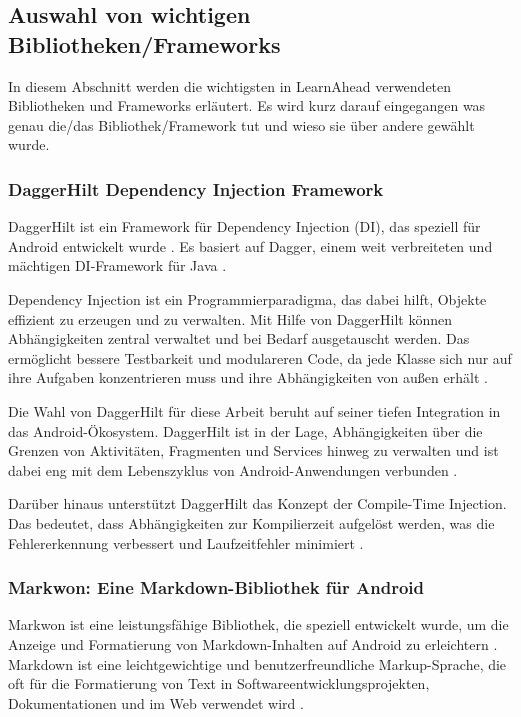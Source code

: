 \subsection{Auswahl von wichtigen Bibliotheken/Frameworks} \label{Auswahl BibliothekenFrameworks}
In diesem Abschnitt werden die wichtigsten in LearnAhead verwendeten Bibliotheken und Frameworks erläutert. Es wird kurz darauf eingegangen was genau die/das Bibliothek/Framework tut und wieso sie über andere gewählt wurde.

\subsubsection{DaggerHilt Dependency Injection Framework}
DaggerHilt ist ein Framework für Dependency Injection (DI), das speziell für Android entwickelt wurde \cite{Dagger2021}. Es basiert auf Dagger, einem weit verbreiteten und mächtigen DI-Framework für Java \cite{AndroidDevelopers2021}. \newline

\noindent
Dependency Injection ist ein Programmierparadigma, das dabei hilft, Objekte effizient zu erzeugen und zu verwalten. Mit Hilfe von DaggerHilt können Abhängigkeiten zentral verwaltet und bei Bedarf ausgetauscht werden. Das ermöglicht bessere Testbarkeit und modulareren Code, da jede Klasse sich nur auf ihre Aufgaben konzentrieren muss und ihre Abhängigkeiten von außen erhält \cite{Dagger2021}. \newline

\noindent
Die Wahl von DaggerHilt für diese Arbeit beruht auf seiner tiefen Integration in das Android-Ökosystem. DaggerHilt ist in der Lage, Abhängigkeiten über die Grenzen von Aktivitäten, Fragmenten und Services hinweg zu verwalten und ist dabei eng mit dem Lebenszyklus von Android-Anwendungen verbunden \cite{AndroidDevelopers2021}. \newline

\noindent
Darüber hinaus unterstützt DaggerHilt das Konzept der Compile-Time Injection. Das bedeutet, dass Abhängigkeiten zur Kompilierzeit aufgelöst werden, was die Fehlererkennung verbessert und Laufzeitfehler minimiert \cite{Dagger2021}.

\subsubsection{Markwon: Eine Markdown-Bibliothek für Android}
Markwon ist eine leistungsfähige Bibliothek, die speziell entwickelt wurde, um die Anzeige und Formatierung von Markdown-Inhalten auf Android zu erleichtern \cite{Markwon2022}. Markdown ist eine leichtgewichtige und benutzerfreundliche Markup-Sprache, die oft für die Formatierung von Text in Softwareentwicklungsprojekten, Dokumentationen und im Web verwendet wird \cite{Gruber2004}. \newline

